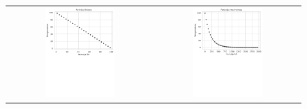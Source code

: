 \begin{figure}[h]
	\centering
\begin{tabular}{ c c }
	\includegraphics[width=0.5\textwidth]{gfx/temp_linear.pdf} & \includegraphics[width=0.5\textwidth]{gfx/temp_quadriatic.pdf} \\

\end{tabular}
\end{figure}
